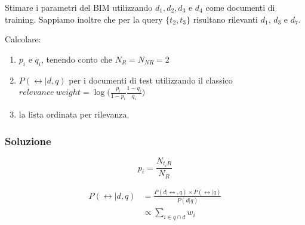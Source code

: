 Stimare i parametri del BIM utilizzando $d_1,d_2, d_3$ e $d_4$ come documenti di training. Sappiamo inoltre che per la query $\{t_2, t_3\}$ risultano rilevanti $d_1$, $d_3$ e $d_7$.

Calcolare:

\begin{enumerate}
	\item $p_i$ e $q_i$, tenendo conto che $N_R = N_{NR} = 2$
	\item $P(\rel | d,q)$ per i documenti di test utilizzando il classico $relevance \ weight = \log\bigg(\frac{p_i}{1-p_i} \frac{1- q_i}{q_i}\bigg)$
	\item la lista ordinata per rilevanza.
\end{enumerate}

\subsubsection{Soluzione}

$$
p_i = \frac{N_{t_iR}}{N_R}
$$

\begin{align*}
P(\rel|d,q)&=\frac{P(d|\rel,q)\times P(\rel|q)}{P(d|q)}\\
&\propto \sum_{i \in q \cap d} w_i
\end{align*}


